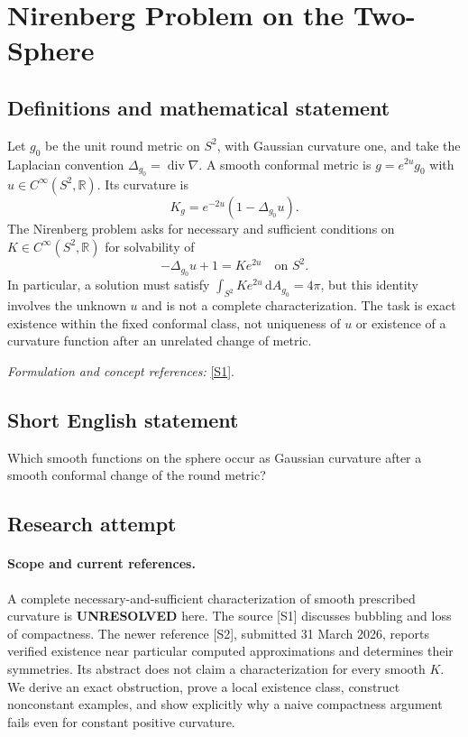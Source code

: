 \documentclass[11pt]{article}
\begin{document}
\section*{\texorpdfstring{Nirenberg Problem on the Two-Sphere}{Nirenberg Problem on the Two-Sphere}}\label{statement}
\subsection{Definitions and mathematical statement}
Let $g_0$ be the unit round metric on $S^2$, with Gaussian curvature one, and take the Laplacian convention $\Delta_{g_0}=\operatorname{div}\nabla$. A smooth conformal metric is $g=e^{2u}g_0$ with $u\in C^\infty(S^2,{\mathbb{R}})$. Its curvature is
\[
 K_g=e^{-2u}(1-\Delta_{g_0}u).
\]
The Nirenberg problem asks for necessary and sufficient conditions on $K\in C^\infty(S^2,{\mathbb{R}})$ for solvability of
\[
 -\Delta_{g_0}u+1=K e^{2u}\quad\text{on }S^2.
\]
In particular, a solution must satisfy $\int_{S^2}K e^{2u}{\,\mathrm{d}} A_{g_0}=4\pi$, but this identity involves the unknown $u$ and is not a complete characterization. The task is exact existence within the fixed conformal class, not uniqueness of $u$ or existence of a curvature function after an unrelated change of metric.
\par\smallskip\textit{Formulation and concept references:} \href{https://link.springer.com/article/10.1007/s00032-022-00370-1}{[S1]}.

\subsection{Short English statement}
Which smooth functions on the sphere occur as Gaussian curvature after a smooth conformal change of the round metric?
\subsection{Research attempt}
\paragraph{Scope and current references.}
A complete necessary-and-sufficient characterization of smooth
prescribed curvature is \textbf{UNRESOLVED} here. The source [S1]
discusses bubbling and loss of compactness. The newer reference [S2],
submitted 31 March 2026, reports verified existence near particular
computed approximations and determines their symmetries. Its abstract
does not claim a characterization for every smooth $K$. We derive
an exact obstruction, prove a local existence class, construct
nonconstant examples, and show explicitly why a naive compactness
argument fails even for constant positive curvature.
\end{document}
